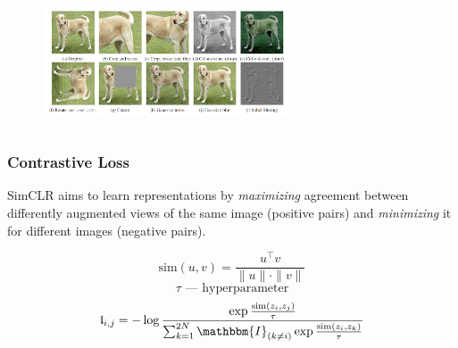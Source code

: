 \documentclass[13pt,aspectratio=169]{beamer}
\begin{document}
\begin{frame}
\begin{columns}
\begin{column}{0.5\textwidth}
\begin{tikzpicture}[scale=0.8]
      \end{tikzpicture}
       
      \begin{figure}
	  \begin{center}
		\includegraphics[width=0.65\textwidth]{imgs/simclr_pipeline.png}
	  \end{center}
      \end{figure}
    \end{column}
  \end{columns}
\end{frame}

\begin{frame}
  \frametitle{Contrastive Loss}
  SimCLR aims to learn representations by \textit{maximizing} 
  agreement between differently augmented views of the same 
  image (positive pairs) and \textit{minimizing} it for different images 
  (negative pairs).

  \begin{equation*}
    \text{sim}(u, v) = \frac{u^{\intercal} v}{\| u \| \cdot \| v \|}
  \end{equation*}
  \begin{equation*}
    \tau\text{~--- hyperparameter}
  \end{equation*}
  \begin{equation*}
    \mathfrak{l}_{i,j} = -\log \frac{\exp { \frac{\text{sim}(z_i, z_j)}{\tau} }}{\sum_{k=1}^{2N} \mathbbm{I}_{(k \neq i)} \exp{\frac{\text{sim}(z_i, z_k)}{\tau}}}
  \end{equation*}

\end{frame}
\end{document}
